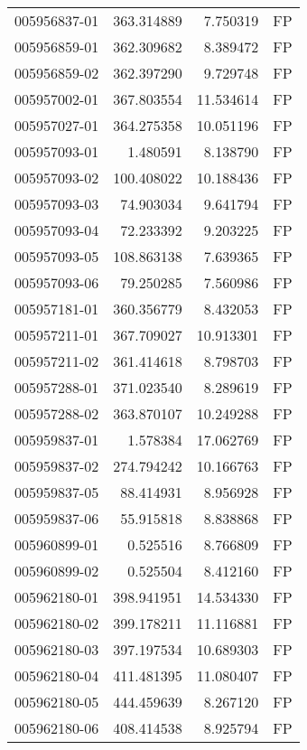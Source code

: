\begin{tabular}{lrrl}
005956837-01 &  363.314889 &       7.750319 &   FP \\
005956859-01 &  362.309682 &       8.389472 &   FP \\
005956859-02 &  362.397290 &       9.729748 &   FP \\
005957002-01 &  367.803554 &      11.534614 &   FP \\
005957027-01 &  364.275358 &      10.051196 &   FP \\
005957093-01 &    1.480591 &       8.138790 &   FP \\
005957093-02 &  100.408022 &      10.188436 &   FP \\
005957093-03 &   74.903034 &       9.641794 &   FP \\
005957093-04 &   72.233392 &       9.203225 &   FP \\
005957093-05 &  108.863138 &       7.639365 &   FP \\
005957093-06 &   79.250285 &       7.560986 &   FP \\
005957181-01 &  360.356779 &       8.432053 &   FP \\
005957211-01 &  367.709027 &      10.913301 &   FP \\
005957211-02 &  361.414618 &       8.798703 &   FP \\
005957288-01 &  371.023540 &       8.289619 &   FP \\
005957288-02 &  363.870107 &      10.249288 &   FP \\
005959837-01 &    1.578384 &      17.062769 &   FP \\
005959837-02 &  274.794242 &      10.166763 &   FP \\
005959837-05 &   88.414931 &       8.956928 &   FP \\
005959837-06 &   55.915818 &       8.838868 &   FP \\
005960899-01 &    0.525516 &       8.766809 &   FP \\
005960899-02 &    0.525504 &       8.412160 &   FP \\
005962180-01 &  398.941951 &      14.534330 &   FP \\
005962180-02 &  399.178211 &      11.116881 &   FP \\
005962180-03 &  397.197534 &      10.689303 &   FP \\
005962180-04 &  411.481395 &      11.080407 &   FP \\
005962180-05 &  444.459639 &       8.267120 &   FP \\
005962180-06 &  408.414538 &       8.925794 &   FP \\

\end{tabular}
